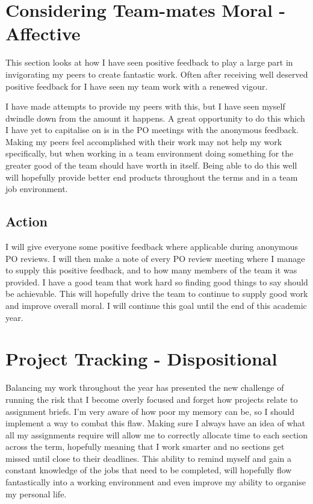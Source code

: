 \documentclass{scrartcl}
\begin{document}
\section{Considering Team-mates Moral - Affective}
This section looks at how I have seen positive feedback to play a large part in invigorating my peers to create fantastic work. Often after receiving well deserved positive feedback for I have seen my team work with a renewed vigour.

I have made attempts to provide my peers with this, but I have seen myself dwindle down from the amount it happens. A great opportunity to do this which I have yet to capitalise on is in the PO meetings with the anonymous feedback. Making my peers feel accomplished with their work may not help my work specifically, but when working in a team environment doing something for the greater good of the team should have worth in itself. Being able to do this well will hopefully provide better end products throughout the terms and in a team job environment.
\subsection{Action}
I will give everyone some positive feedback where applicable during anonymous PO reviews. I will then make a note of every PO review meeting where I manage to supply this positive feedback, and to how many members of the team it was provided. I have a good team that work hard so finding good things to say should be achievable. This will hopefully drive the team to continue to supply good work and improve overall moral. I will continue this goal until the end of this academic year.

\section{Project Tracking - Dispositional}
Balancing my work throughout the year has presented the new challenge of running the risk that I become overly focused and forget how projects relate to assignment briefs. I'm very aware of how poor my memory can be, so I should implement a way to combat this flaw. Making sure I always have an idea of what all my assignments require will allow me to correctly allocate time to each section across the term, hopefully meaning that I work smarter and no sections get missed until close to their deadlines. This ability to remind myself and gain a constant knowledge of the jobs that need to be completed, will hopefully flow fantastically into a working environment and even improve my ability to organise my personal life.
\end{document}
